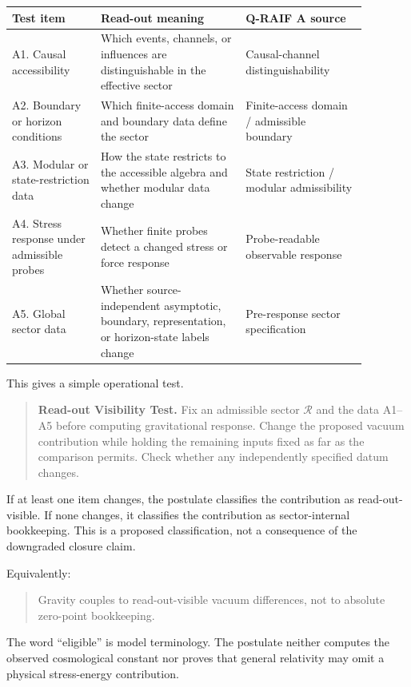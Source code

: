 \documentclass[12pt,a4paper]{article}
\theoremstyle{definition}
\theoremstyle{remark}
\begin{document}
\begin{center}
\begin{tabular}{P{0.22\linewidth}P{0.36\linewidth}P{0.30\linewidth}}
\toprule
\textbf{Test item} & \textbf{Read-out meaning} & \textbf{Q-RAIF A source} \\
\midrule
A1. Causal accessibility & Which events, channels, or influences are distinguishable in the effective sector & Causal-channel distinguishability \\
A2. Boundary or horizon conditions & Which finite-access domain and boundary data define the sector & Finite-access domain / admissible boundary \\
A3. Modular or state-restriction data & How the state restricts to the accessible algebra and whether modular data change & State restriction / modular admissibility \\
A4. Stress response under admissible probes & Whether finite probes detect a changed stress or force response & Probe-readable observable response \\
A5. Global sector data & Whether source-independent asymptotic, boundary, representation, or horizon-state labels change & Pre-response sector specification \\
\bottomrule
\end{tabular}
\end{center}

This gives a simple operational test.

\begin{quote}
\textbf{Read-out Visibility Test.} Fix an admissible sector $\mathcal{R}$ and the data A1--A5 before computing gravitational response. Change the proposed vacuum contribution while holding the remaining inputs fixed as far as the comparison permits. Check whether any independently specified datum changes.
\end{quote}

If at least one item changes, the postulate classifies the contribution as read-out-visible. If none changes, it classifies the contribution as sector-internal bookkeeping.  This is a proposed classification, not a consequence of the downgraded closure claim.

Equivalently:

\begin{quote}
Gravity couples to read-out-visible vacuum differences, not to absolute zero-point bookkeeping.
\end{quote}

The word ``eligible'' is model terminology. The postulate neither computes the observed cosmological constant nor proves that general relativity may omit a physical stress-energy contribution.
\end{document}

